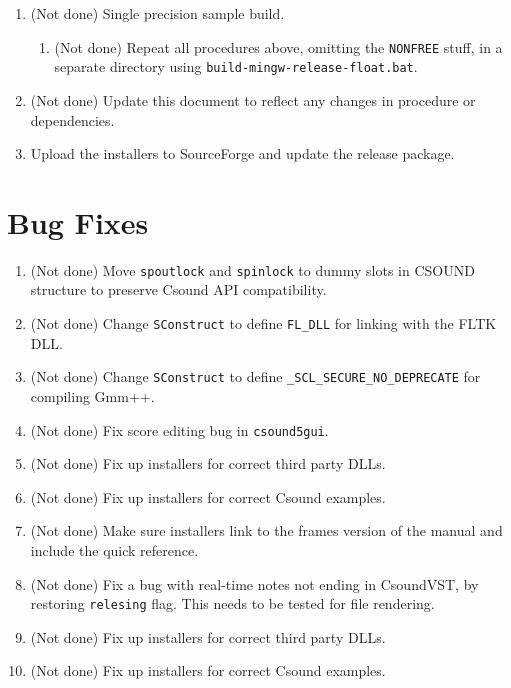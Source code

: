 \documentclass[11pt,letterpaper,onecolumn]{scrartcl}
\begin{document}
\begin{sloppypar}
\begin{enumerate}
\begin{enumerate}
\begin{enumerate}
				\end{enumerate}
			\item (Not done) Single precision sample build.			
				\begin{enumerate}
					\item (Not done) Repeat all procedures above, omitting the \verb|NONFREE| stuff, in a separate directory using \texttt{build-mingw-release-float.bat}. 
				\end{enumerate}
	    \item (Not done) Update this document to reflect any changes in procedure or dependencies. 
	    \item Upload the installers to SourceForge and update the release package.
		\end{enumerate}
 \end{enumerate}

\section{Bug Fixes}
\label{sec:BugFixes}

\begin{enumerate}
	\item (Not done) Move \texttt{spoutlock} and \texttt{spinlock} to dummy slots in CSOUND structure to preserve Csound API compatibility.
	\item (Not done) Change \texttt{SConstruct} to define \verb|FL_DLL| for linking with the FLTK DLL.
	\item (Not done) Change \texttt{SConstruct} to define \verb|_SCL_SECURE_NO_DEPRECATE| for compiling Gmm++.
	\item (Not done) Fix score editing bug in \texttt{csound5gui}.
	\item (Not done) Fix up installers for correct third party DLLs.
	\item (Not done) Fix up installers for correct Csound examples.
	\item (Not done) Make sure installers link to the frames version of the manual and include the quick reference.
	\item (Not done) Fix a bug with real-time notes not ending in CsoundVST, by restoring \texttt{relesing} flag. This needs to be tested for file rendering.
	\item (Not done) Fix up installers for correct third party DLLs.
	\item (Not done) Fix up installers for correct Csound examples.
\end{enumerate}


\end{sloppypar}
\end{document}
